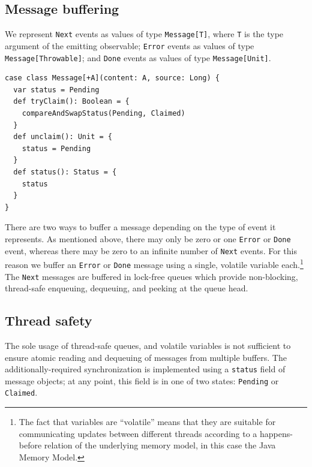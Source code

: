 \documentclass[runningheads]{llncs}
\begin{document}
\begin{sloppypar}

\subsection{Message buffering}

We represent \texttt{Next} events as values of type \texttt{Message[T]}, where
\texttt{T} is the type argument of the emitting observable; \texttt{Error}
events as values of type \texttt{Message[Throwable]}; and \texttt{Done} events
as values of type \texttt{Message[Unit]}.

\begin{lstlisting}[label=lst:message_class, caption= Events are represented as instances of class \texttt{Message}]
case class Message[+A](content: A, source: Long) {
  var status = Pending
  def tryClaim(): Boolean = {
    compareAndSwapStatus(Pending, Claimed)
  }
  def unclaim(): Unit = {
    status = Pending
  }
  def status(): Status = {
    status
  }
}
\end{lstlisting}

There are two ways to buffer a message depending on the type of event it
represents. As mentioned above, there may only be zero or one \texttt{Error}
or \texttt{Done} event, whereas there may be zero to an infinite number of
\texttt{Next} events. For this reason we buffer an \texttt{Error} or
\texttt{Done} message using a single, volatile variable each.\footnote{The
fact that variables are ``volatile'' means that they are suitable for
communicating updates between different threads according to a happens-before
relation of the underlying memory model, in this case the Java Memory Model.}
The \texttt{Next} messages are buffered in lock-free queues which provide
non-blocking, thread-safe enqueuing, dequeuing, and peeking at the queue head.

\subsection{Thread safety}

The sole usage of thread-safe queues, and volatile variables is not sufficient
to ensure atomic reading and dequeuing of messages from multiple buffers. The
additionally-required synchronization is implemented using a \texttt{status}
field of message objects; at any point, this field is in one of two states:
\texttt{Pending} or \texttt{Claimed}.


\end{sloppypar}
\end{document}
